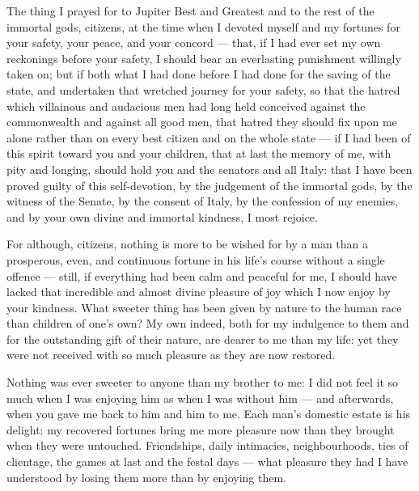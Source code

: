 
 The thing I prayed for to Jupiter Best and Greatest and to the rest of the immortal gods, citizens, at the time when I devoted myself and my fortunes for your safety, your peace, and your concord --- that, if I had ever set my own reckonings before your safety, I should bear an everlasting punishment willingly taken on; but if both what I had done before I had done for the saving of the state, and undertaken that wretched journey for your safety, so that the hatred which villainous and audacious men had long held conceived against the commonwealth and against all good men, that hatred they should fix upon me alone rather than on every best citizen and on the whole state --- if I had been of this spirit toward you and your children, that at last the memory of me, with pity and longing, should hold you and the senators and all Italy: that I have been proved guilty of this self-devotion, by the judgement of the immortal gods, by the witness of the Senate, by the consent of Italy, by the confession of my enemies, and by your own divine and immortal kindness, I most rejoice.

 For although, citizens, nothing is more to be wished for by a man than a prosperous, even, and continuous fortune in his life's course without a single offence --- still, if everything had been calm and peaceful for me, I should have lacked that incredible and almost divine pleasure of joy which I now enjoy by your kindness. What sweeter thing has been given by nature to the human race than children of one's own? My own indeed, both for my indulgence to them and for the outstanding gift of their nature, are dearer to me than my life: yet they were not received with so much pleasure as they are now restored.

 Nothing was ever sweeter to anyone than my brother to me: I did not feel it so much when I was enjoying him as when I was without him --- and afterwards, when you gave me back to him and him to me. Each man's domestic estate is his delight: my recovered fortunes bring me more pleasure now than they brought when they were untouched. Friendships, daily intimacies, neighbourhoods, ties of clientage, the games at last and the festal days --- what pleasure they had I have understood by losing them more than by enjoying them.

